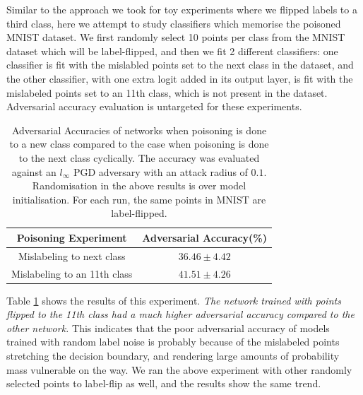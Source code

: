 \documentclass{ociamthesis}
\begin{document}
Similar to the approach we took for toy experiments where we flipped labels to a
third class, here we attempt to study classifiers which memorise the poisoned
MNIST dataset. We first randomly select 10 points per class from the MNIST
dataset which will be label-flipped, and then we fit 2 different classifiers:
one classifier is fit with the mislabled points set to the next class in the
dataset, and the other classifier, with one extra logit added in its output
layer, is fit with the mislabeled points set to an 11th class, which is not
present in the dataset. Adversarial accuracy evaluation is untargeted for these
experiments.

\begin{table}[h!]
\centering
\begin{tabular}{|c | c|} 
 \hline
 Poisoning Experiment & Adversarial Accuracy(\%) \\ [0.5ex] 
 \hline\hline
 Mislabeling to next class & $36.46 \pm 4.42$ \\
 \hline
 Mislabeling to an 11th class & $41.51 \pm 4.26$\\
 \hline
\end{tabular}
\caption{Adversarial Accuracies of networks when poisoning is done to a new
class compared to the case when poisoning is done to the next class cyclically.
The accuracy was evaluated against an $l_\infty$ PGD adversary with an attack
radius of $0.1$. Randomisation in the above results is over model
initialisation. For each run, the same points in MNIST are label-flipped.}
\label{table:mnist-class-10}
\end{table}

Table \ref{table:mnist-class-10} shows the results of this experiment. \emph{The
network trained with points flipped to the 11th class had a much higher
adversarial accuracy compared to the other network.} This indicates that the
poor adversarial accuracy of models trained with random label noise is probably
because of the mislabeled points stretching the decision boundary, and rendering
large amounts of probability mass vulnerable on the way. We ran the above
experiment with other randomly selected points to label-flip as well, and the
results show the same trend.


\end{document}
